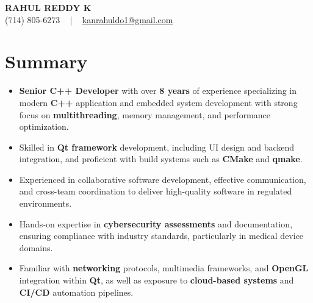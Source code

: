 \documentclass[letterpaper,11pt]{article}
\newcommand{\resumeItem}[1]{
  \item\footnotesize{
    {#1 \vspace{-2pt}}
  }
}
\newcommand{\resumeItemListStart}{\begin{itemize}[leftmargin=*]}
\newcommand{\resumeItemListEnd}{\end{itemize}\vspace{-5pt}}
\begin{document}
\begin{center}
    {\fontsize{14pt}{12pt}\selectfont \textbf{\MakeUppercase{Rahul Reddy K}}}\\ \vspace{2pt}
    \fontsize{10pt}{12pt}\selectfont (714) 805-6273 ~ | ~ \href{mailto:kanrahuldo1@gmail.com}{kanrahuldo1@gmail.com}~
    \vspace{-8pt}
\end{center}

\section{Summary}
\fontsize{9pt}{10pt}\selectfont
\resumeItemListStart
    \resumeItem{\textbf{Senior C++ Developer} with over \textbf{8 years} of experience specializing in modern \textbf{C++} application and embedded system development with strong focus on \textbf{multithreading}, memory management, and performance optimization.}
    \resumeItem{Skilled in \textbf{Qt framework} development, including UI design and backend integration, and proficient with build systems such as \textbf{CMake} and \textbf{qmake}.}
    \resumeItem{Experienced in collaborative software development, effective communication, and cross-team coordination to deliver high-quality software in regulated environments.}
    \resumeItem{Hands-on expertise in \textbf{cybersecurity assessments} and documentation, ensuring compliance with industry standards, particularly in medical device domains.}
    \resumeItem{Familiar with \textbf{networking} protocols, multimedia frameworks, and \textbf{OpenGL} integration within \textbf{Qt}, as well as exposure to \textbf{cloud-based systems} and \textbf{CI/CD} automation pipelines.}
\resumeItemListEnd
\vspace{-6pt}
\end{document}
